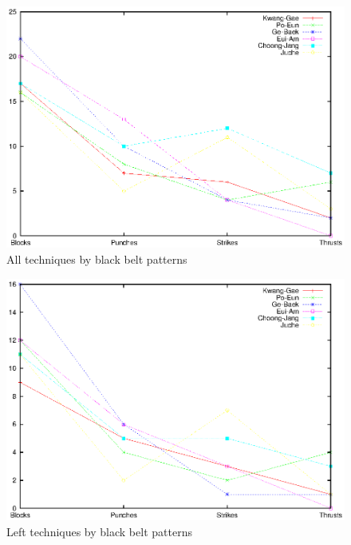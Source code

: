 \documentclass[10pt,twocolumn,a4paper]{article}
\begin{document}
  \begin{figure}
    \includegraphics[scale=0.72]{data/gnuplot/eps/patterns_black_all}
    \caption{All techniques by black belt patterns}
    \label{fig:patterns_black_all}
  \end{figure}


  \begin{figure}
    \includegraphics[scale=0.72]{data/gnuplot/eps/patterns_black_left}
    \caption{Left techniques by black belt patterns}
    \label{fig:patterns_black_left}
  \end{figure}
\end{document}
